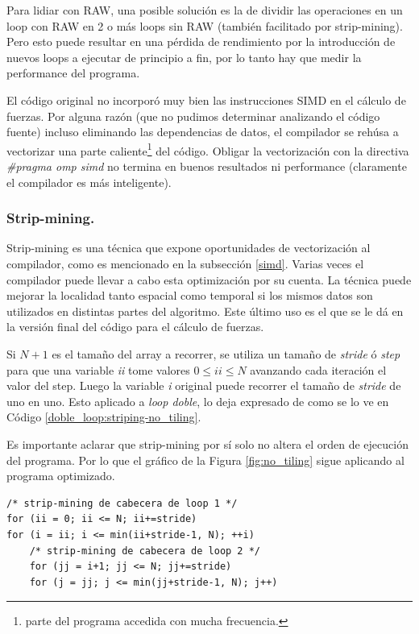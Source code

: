 \documentclass{article}
\begin{document}
Para lidiar con RAW, una posible solución es la de dividir las operaciones en un loop con RAW en 2 o más loops sin RAW (también
facilitado por strip-mining). Pero esto puede resultar en una pérdida de rendimiento por la introducción
de nuevos loops a ejecutar de principio a fin, por lo tanto hay que medir la performance del programa.


El código original no incorporó muy bien las instrucciones SIMD en el cálculo de fuerzas.
Por alguna razón (que no pudimos determinar analizando el código fuente)
incluso eliminando las dependencias de datos, el compilador se rehúsa a vectorizar
una parte caliente\footnote{parte del programa accedida con mucha frecuencia.} del código. Obligar la vectorización
con la directiva \textit{\#pragma omp simd} no termina en buenos resultados ni performance (claramente el compilador
es más inteligente).

\subsubsection{Strip-mining.\label{strip-mining}}
Strip-mining es una técnica que expone oportunidades de vectorización al compilador, como es mencionado
en la subsección \ref{simd}. Varias veces el compilador puede llevar a cabo esta optimización por su cuenta. La técnica
puede mejorar la localidad tanto espacial como temporal si los mismos datos son utilizados en distintas partes
del algoritmo. Este último uso es el que se le dá en la versión final del código para el cálculo de fuerzas.


Si $N + 1$ es el tamaño del array a recorrer, se utiliza un tamaño de \textit{stride} ó \textit{step} para que una variable \textit{ii}
tome valores $0\leq{ii}\leq N$ avanzando cada iteración el valor del step. Luego la variable \textit{i} original puede recorrer
el tamaño de \textit{stride} de uno en uno. Esto aplicado a \textit{loop doble}, lo deja expresado de como se lo ve en
Código \ref{doble_loop:striping-no_tiling}.

Es importante aclarar que strip-mining por sí solo no altera el orden de ejecución del programa. Por lo
que el gráfico de la Figura \ref{fig:no_tiling} sigue aplicando al programa optimizado.

\begin{lstlisting}[style=CStyle,label=doble_loop:striping-no_tiling,caption=doble loop con strip-mining en ambos loops.]
/* strip-mining de cabecera de loop 1 */
for (ii = 0; ii <= N; ii+=stride)
for (i = ii; i <= min(ii+stride-1, N); ++i)
	/* strip-mining de cabecera de loop 2 */
	for (jj = i+1; jj <= N; jj+=stride)
	for (j = jj; j <= min(jj+stride-1, N); j++)
\end{lstlisting}
\end{document}
